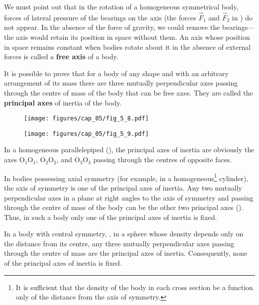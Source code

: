 We must point out that in the rotation of a homogeneous symmetrical body, forces of lateral pressure of the bearings on the axis (the forces $\vec{F}_1$ and $\vec{F}_2$ in ) do not appear. In the absence of the force of gravity, we could remove the bearings---the axis would retain its position in space without them. An axis whose position in space remains constant when bodies rotate about it in the absence of external forces is called a \textbf{free axis} of a body.

It is possible to prove that for a body of any shape and with an arbitrary arrangement of its mass there are three mutually perpendicular axes passing through the centre of mass of the body that can be free axes. They are called the \textbf{principal axes} of inertia of the body.

\begin{figure}[t]
	\begin{minipage}[t]{0.5\linewidth}
		\begin{center}
			\texttt{[image: figures/cap\_05/fig\_5\_8.pdf]}
			\caption[]{}
			\label{fig:5_8}
		\end{center}
	\end{minipage}
	\hspace{-0.05cm}
	\begin{minipage}[t]{0.5\linewidth}
		\begin{center}
			\texttt{[image: figures/cap\_05/fig\_5\_9.pdf]}
			\caption[]{}
			\label{fig:5_9}
		\end{center}
	\end{minipage}
\vspace{-0.7cm}
\end{figure}

In a homogeneous parallelepiped (), the principal axes of inertia are obviously the axes O$_1$O$_1$, O$_2$O$_2$, and O$_3$O$_3$ passing through the centres of opposite faces.

In bodies possessing axial symmetry (for example, in a homogeneous\footnote{It is sufficient that the density of the body in each cross section be a function only of the distance from the axis of symmetry.} cylinder), the axis of symmetry is one of the principal axes of inertia. Any two mutually perpendicular axes in a plane at right angles to the axis of symmetry and passing through the centre of mass of the body can be the other two principal axes (). Thus, in such a body only one of the principal axes of inertia is fixed.

In a body with central symmetry, \ie, in a sphere whose density depends only on the distance from its centre, any three mutually perpendicular axes passing through the centre of mass are the principal axes of inertia. Consequently, none of the principal axes of inertia is fixed. 

